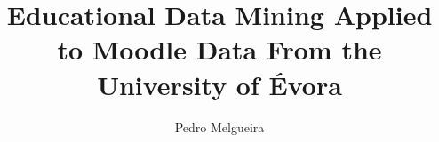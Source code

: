 \documentclass{beamer}
\title[]
{Educational Data Mining Applied to Moodle Data From the University of Évora}
\subtitle{}
\author[]
{Pedro Melgueira}
\institute[]{Universidade de Évora}
\begin{document}
\frame{\titlepage}





\end{document}
